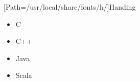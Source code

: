 \documentclass[cn,chinesetitle=simpletitle,10pt,a4paper]{justresume}
\author{范云潜}
\begin{document}
[Path=/usr/local/share/fonts/h/]{Handing}
\renewcommand{\chtitle}{\CJKfamily{tm}}

\maketitle




\zhlipsum[1]


\zhlipsum[2]


\zhlipsum[3]


\zhlipsum[4]

\begin{itemize}[label={\(\circ\)}]
    \item C
    \item C++
    \item Java 
    \item Scala
\end{itemize}
\end{document}
